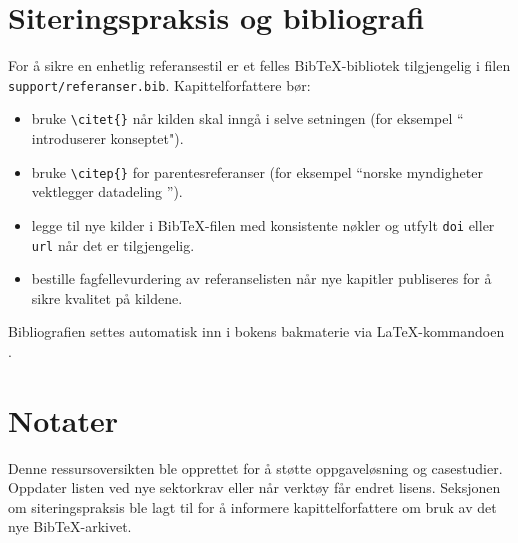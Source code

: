 \section{Siteringspraksis og bibliografi}
For å sikre en enhetlig referansestil er et felles Bib\TeX-bibliotek tilgjengelig i filen \texttt{support/referanser.bib}. Kapittelforfattere bør:
\begin{itemize}
    \item bruke \verb+\citet{}+ når kilden skal inngå i selve setningen (for eksempel ``\citet{grieves2017digital} introduserer konseptet").
    \item bruke \verb+\citep{}+ for parentesreferanser (for eksempel ``norske myndigheter vektlegger datadeling \citep{regjeringen2022datastrategi}'').
    \item legge til nye kilder i Bib\TeX-filen med konsistente nøkler og utfylt \texttt{doi} eller \texttt{url} når det er tilgjengelig.
    \item bestille fagfellevurdering av referanselisten når nye kapitler publiseres for å sikre kvalitet på kildene.
\end{itemize}

Bibliografien settes automatisk inn i bokens bakmaterie via \LaTeX-kommandoen \verb++.

\section{Notater}
Denne ressursoversikten ble opprettet for å støtte oppgaveløsning og casestudier. Oppdater listen ved nye sektorkrav eller når verktøy får endret lisens. Seksjonen om siteringspraksis ble lagt til for å informere kapittelforfattere om bruk av det nye Bib\TeX-arkivet.
